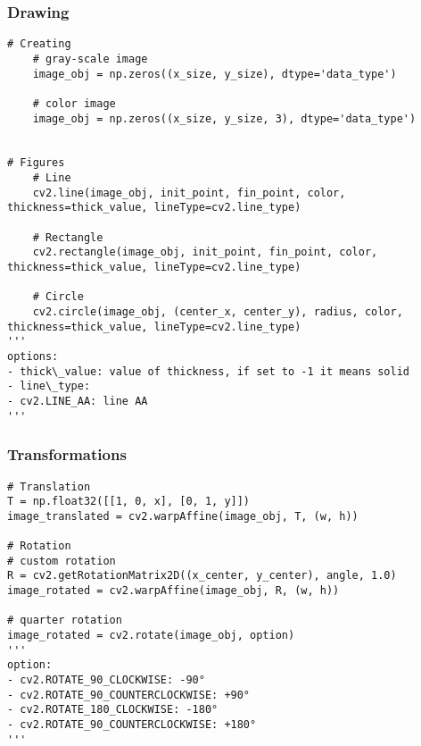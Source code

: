 \subsubsection{Drawing}

\begin{verbatim}
# Creating
    # gray-scale image
    image_obj = np.zeros((x_size, y_size), dtype='data_type')

    # color image
    image_obj = np.zeros((x_size, y_size, 3), dtype='data_type')


# Figures
    # Line
    cv2.line(image_obj, init_point, fin_point, color, thickness=thick_value, lineType=cv2.line_type)
    
    # Rectangle
    cv2.rectangle(image_obj, init_point, fin_point, color, thickness=thick_value, lineType=cv2.line_type)
    
    # Circle
    cv2.circle(image_obj, (center_x, center_y), radius, color, thickness=thick_value, lineType=cv2.line_type)
'''
options:
- thick\_value: value of thickness, if set to -1 it means solid
- line\_type: 
- cv2.LINE_AA: line AA
'''
\end{verbatim}




\subsubsection{Transformations}

\begin{verbatim}
# Translation
T = np.float32([[1, 0, x], [0, 1, y]])
image_translated = cv2.warpAffine(image_obj, T, (w, h))

# Rotation
# custom rotation
R = cv2.getRotationMatrix2D((x_center, y_center), angle, 1.0)
image_rotated = cv2.warpAffine(image_obj, R, (w, h))

# quarter rotation
image_rotated = cv2.rotate(image_obj, option)
'''
option:
- cv2.ROTATE_90_CLOCKWISE: -90°
- cv2.ROTATE_90_COUNTERCLOCKWISE: +90°
- cv2.ROTATE_180_CLOCKWISE: -180°
- cv2.ROTATE_90_COUNTERCLOCKWISE: +180°
'''
\end{verbatim}


